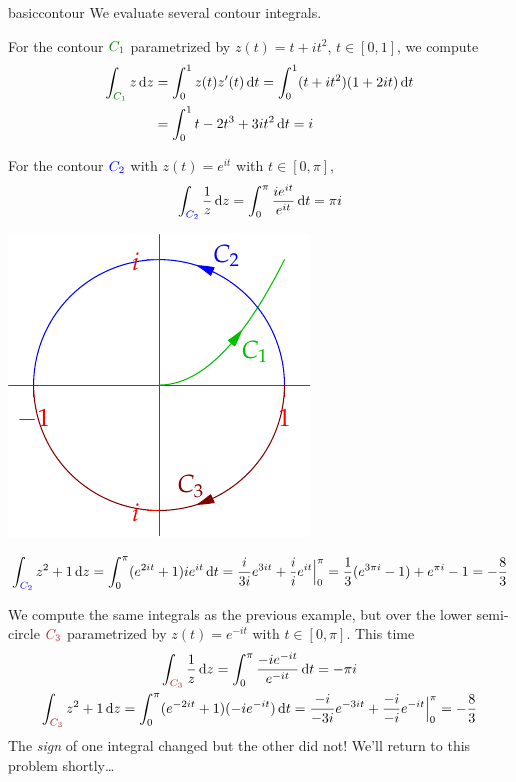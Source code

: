 \begin{examples}{}{basiccontour}
We evaluate several contour integrals.
\begin{enumerate}
  \begin{minipage}[t]{0.65\linewidth}\vspace{-5pt}
  \item For the contour $\textcolor{Green}{C_1}$ parametrized by $z(t)=t+it^2$, $t\in[0,1]$, we compute
  \begin{align*}
  \int_{\textcolor{Green}{C_1}}z\,\dz&=\int_0^1z(t)z'(t)\,\dt=\int_0^1(t+it^2)(1+2it)\,\dt\\
  &=\int_0^1t-2t^3+3it^2\,\dt=i
  \end{align*}
  
  \item For the contour $\textcolor{blue}{C_2}$ with $z(t)=e^{it}$ with $t\in[0,\pi]$,
  \[
  \int_{\textcolor{blue}{C_2}}\frac 1z\,{\mathrm{d} z} =\int_0^{\pi}\frac{ie^{it}}{e^{it}}\,{\mathrm{d} t} =\pi i
  \]
  \end{minipage}\begin{minipage}[t]{0.35\linewidth}\vspace{-10pt}
  \flushright\includegraphics{contours-ex4}
  \end{minipage}\par
  \vspace{-10pt}
  
  \item[]
  \[
  \int_{\textcolor{blue}{C_2}}z^2+1\,{\mathrm{d} z} =\int_0^{\pi}(e^{2it}+1)ie^{it}\,{\mathrm{d} t} =\frac i{3i}e^{3it}+\frac i{i}e^{it}\Big|_0^{\pi}= \frac 13(e^{3\pi i}-1)+e^{\pi i}-1=-\frac 83
  \]
  \item We compute the same integrals as the previous example, but over the lower semi-circle $\textcolor{Brown}{C_3}$ parametrized by $z(t)=e^{-it}$ with $t\in[0,\pi]$. This time
  \begin{gather*}
  \int_{\textcolor{Brown}{C_3}}\frac 1z\,\dz =\int_0^{\pi}\frac{-ie^{-it}}{e^{-it}}\,\dt =-\pi i\\
  \int_{\textcolor{Brown}{C_3}}z^2+1\,\dz =\int_0^{\pi}(e^{-2it}+1)(-ie^{-it})\,\dt =\frac{-i}{-3i}e^{-3it}+\frac{-i}{-i}e^{-it}\Big|_0^{\pi}=-\frac 83
  \end{gather*}
  The \emph{sign} of one integral changed but the other did not! We'll return to this problem shortly\ldots
\end{enumerate}
\end{examples}


